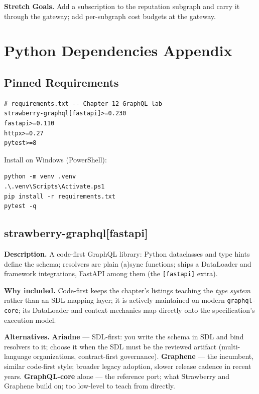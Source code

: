 \textbf{Stretch Goals.} Add a subscription to the reputation subgraph and
carry it through the gateway; add per-subgraph cost budgets at the
gateway.

\section{Python Dependencies Appendix}
\label{sec:ch12-dependencies}

\subsection{Pinned Requirements}

\begin{verbatim}
# requirements.txt -- Chapter 12 GraphQL lab
strawberry-graphql[fastapi]>=0.230
fastapi>=0.110
httpx>=0.27
pytest>=8
\end{verbatim}

Install on Windows (PowerShell):

\begin{verbatim}
python -m venv .venv
.\.venv\Scripts\Activate.ps1
pip install -r requirements.txt
pytest -q
\end{verbatim}

\subsection{strawberry-graphql[fastapi]}

\textbf{Description.} A code-first GraphQL library: Python dataclasses
and type hints define the schema; resolvers are plain (a)sync functions;
ships a DataLoader and framework integrations, FastAPI among them (the
\texttt{[fastapi]} extra).

\textbf{Why included.} Code-first keeps the chapter's listings teaching
the \emph{type system} rather than an SDL mapping layer; it is actively
maintained on modern \texttt{graphql-core}; its DataLoader and context
mechanics map directly onto the specification's execution model.

\textbf{Alternatives.} \textbf{Ariadne} --- SDL-first: you write the
schema in SDL and bind resolvers to it; choose it when the SDL must be
the reviewed artifact (multi-language organizations, contract-first
governance). \textbf{Graphene} --- the incumbent, similar code-first
style; broader legacy adoption, slower release cadence in recent years.
\textbf{GraphQL-core} alone --- the reference port; what Strawberry and
Graphene build on; too low-level to teach from directly.

